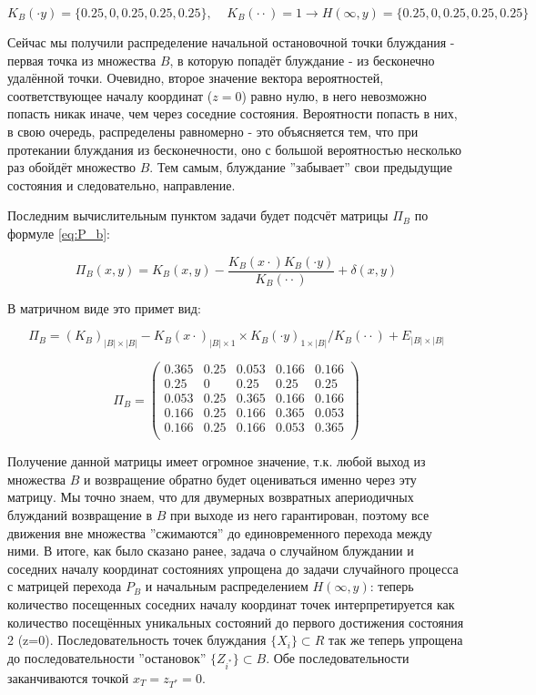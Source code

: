 \[ K_B( \cdot y) = \{ 0.25, 0, 0.25, 0.25, 0.25\},\ \ \ \ \ K_B(\cdot \cdot) = 1 \rightarrow H(\infty, y) = \{ 0.25, 0, 0.25, 0.25, 0.25\}\]

Сейчас мы получили распределение начальной остановочной точки блуждания - первая точка из множества $B$, в которую попадёт блуждание - из бесконечно удалённой точки.
Очевидно, второе значение вектора вероятностей, соответствующее началу координат ($z = 0$) равно нулю, в него невозможно попасть никак иначе, чем через соседние состояния.
Вероятности попасть в них, в свою очередь, распределены равномерно - это объясняется тем, что при протекании блуждания из бесконечности, оно с большой вероятностью несколько раз обойдёт множество $B$.
Тем самым, блуждание ''забывает'' свои предыдущие состояния и следовательно, направление.

Последним вычислительным пунктом задачи будет подсчёт матрицы $\Pi_B$ по формуле \eqref{eq:P_b}:

\[ \Pi_B(x,y) = K_B(x,y) - \frac{K_B(x \cdot) K_B(\cdot y)}{K_B(\cdot \cdot)} + \delta(x,y) \]

В матричном виде это примет вид:

\[ \Pi_B = (K_B)_{|B| \times |B|} - K_B(x \cdot)_{|B| \times 1} \times K_B(\cdot y)_{1 \times |B|} / K_B(\cdot \cdot) + E_{|B| \times |B|} \]

\begin{equation}
\Pi_B = 
	\begin{pmatrix}
		0.365 & 0.25 & 0.053 & 0.166 & 0.166 \\
		0.25 & 0 & 0.25 & 0.25 & 0.25\\
		0.053 & 0.25 & 0.365 & 0.166 &  0.166\\
		0.166 & 0.25 & 0.166 & 0.365 & 0.053\\
		0.166 & 0.25 & 0.166 & 0.053 & 0.365\\
	\end{pmatrix}
\end{equation}

Получение данной матрицы имеет огромное значение, т.к. любой выход из множества $B$ и возвращение обратно будет оцениваться именно через эту матрицу.
Мы точно знаем, что для двумерных возвратных апериодичных блужданий возвращение в $B$ при выходе из него гарантирован, поэтому все движения вне множества ''сжимаются'' до единовременного
перехода между ними.
В итоге, как было сказано ранее, задача о случайном блуждании и соседних началу координат состояниях упрощена до задачи случайного процесса с матрицей перехода $P_B$ и начальным распределением $H(\infty,y)$:
теперь количество посещенных соседних началу координат точек интерпретируется как количество посещённых уникальных состояний до первого достижения состояния 2 (z=0).
Последовательность точек блуждания $\{X_i\} \subset R$ так же теперь упрощена до последовательности ''остановок'' $\{Z_{i^*}\} \subset B$. Обе последовательности заканчиваются точкой $x_T = z_{T^*} = 0$.

